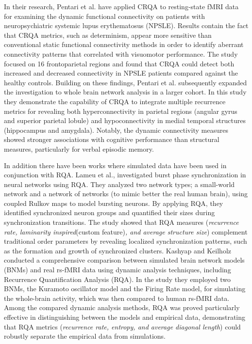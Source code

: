 \documentclass{article}
\begin{document}
			In their research, Pentari et al.\cite{pentari22} have applied CRQA to resting-state fMRI data 
			for examining the dynamic functional connectivity on patients with neuropsychiatric systemic 
			lupus erythematosus (NPSLE). Results contain the fact that CRQA metrics, such as determinism,
			appear more sensitive than conventional static functional connectivity methods in order to
			identify aberrant connectivity patterns that correlated with visuomotor performance. 
			The study focused on 16 frontoparietal regions and found that CRQA could detect 
			both increased and decreased connectivity in NPSLE patients compared against the healthy controls. 
			Building on these findings, Pentari et al.\cite{pentari23} subsequently expanded 
			the investigation to whole brain network analysis in a larger cohort. 
			In this study they demonstrate the capability of CRQA to integrate multiple recurrence metrics 
			for revealing both hyperconnectivity in parietal regions (angular gyrus and superior parietal lobule) 
			and hypoconnectivity in medial temporal structures (hippocampus and amygdala). 
			Notably, the dynamic connectivity measures showed stronger associations with cognitive 
			performance than structural measures, particularly for verbal episodic memory. 

			In addition there have been works where simulated data 
			have been used in conjunction with RQA.
			Lameu et al.\cite{lameu2018}, investigated burst phase synchronization in neural networks using RQA. 
			They analyzed two network types; a small-world network and a network of networks 
			(to mimic better the real human brain), using coupled Rulkov maps to model bursting neurons. 
			By applying RQA, they identified synchronized neuron groups and quantified their 
			sizes during synchronization transitions. The study showed that RQA measures 
			(\textit{recurrence rate, laminarity inspired}(custom feature)\textit{, and average structure size}) complement 
			traditional order parameters by revealing localized synchronization patterns, 
			such as the formation and growth of synchronized clusters.
			Kashyap and Keilholz\cite{kashyap2019} conducted a comprehensive comparison 
			between simulated brain network models (BNMs) and real rs-fMRI data using 
			dynamic analysis techniques, including Recurrence Quantification Analysis (RQA). 
			In the study they employed two BNMs, the Kuramoto oscillator model and the Firing Rate model, for simulating
			the whole-brain activity, which was then compared to human rs-fMRI data. 
			Among the compared dynamic analysis methods, RQA was proved particularly effective 
			in distinguishing between the models and empirical data, demonstrating that RQA metrics 
			(\textit{recurrence rate, entropy, and average diagonal length}) could robustly separate the empirical data from simulations. 
		   
\end{document}
